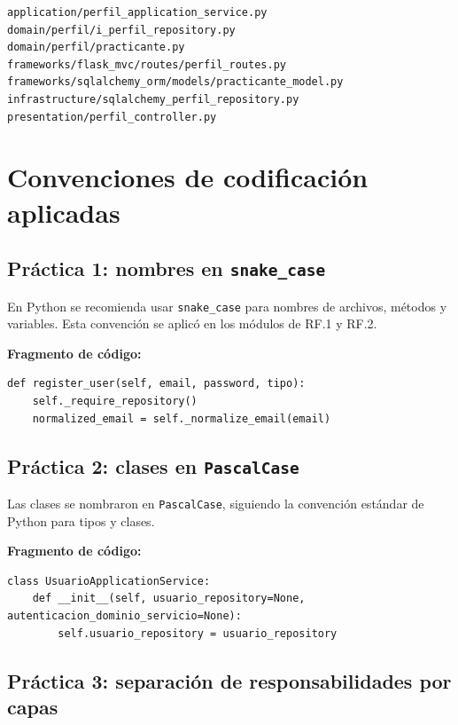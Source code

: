 \documentclass[12pt,a4paper]{article}
\begin{document}
\begin{lstlisting}[style=textstyle]
application/perfil_application_service.py
domain/perfil/i_perfil_repository.py
domain/perfil/practicante.py
frameworks/flask_mvc/routes/perfil_routes.py
frameworks/sqlalchemy_orm/models/practicante_model.py
infrastructure/sqlalchemy_perfil_repository.py
presentation/perfil_controller.py
\end{lstlisting}

\section{Convenciones de codificación aplicadas}

\subsection{Práctica 1: nombres en \texttt{snake\_case}}

En Python se recomienda usar \texttt{snake\_case} para nombres de archivos, métodos y variables. Esta convención se aplicó en los módulos de RF.1 y RF.2.

\textbf{Fragmento de código:}

\begin{lstlisting}[style=pythonstyle]
def register_user(self, email, password, tipo):
    self._require_repository()
    normalized_email = self._normalize_email(email)
\end{lstlisting}

\subsection{Práctica 2: clases en \texttt{PascalCase}}

Las clases se nombraron en \texttt{PascalCase}, siguiendo la convención estándar de Python para tipos y clases.

\textbf{Fragmento de código:}

\begin{lstlisting}[style=pythonstyle]
class UsuarioApplicationService:
    def __init__(self, usuario_repository=None, autenticacion_dominio_servicio=None):
        self.usuario_repository = usuario_repository
\end{lstlisting}

\subsection{Práctica 3: separación de responsabilidades por capas}
\end{document}
